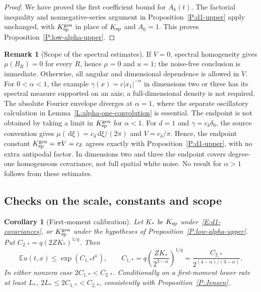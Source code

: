 \documentclass[12pt]{article}
\numberwithin{equation}{section}
\newtheorem{corollary}[theorem]{Corollary}
\theoremstyle{definition}
\newtheorem{remark}[theorem]{Remark}
\newcommand{\E}{\mathbb{E}}
\newcommand{\ud}{\,\mathrm{d}}
\begin{document}
\begin{proof}
  We have proved the first coefficient bound for $A_k(t)$. The
  factorial inequality and nonnegative-series argument in
  Proposition~\ref{P:d1-upper} apply unchanged, with
  $K_{\rm sp}^{\rm gen}$ in place of $K_{\rm sp}$ and $A_0=1$.
  This proves Proposition~\ref{P:low-alpha-upper}.
\end{proof}

\begin{remark}[Scope of the spectral estimates]\label{R:low-alpha-scope}
  If $V=0$, spectral homogeneity gives $\mu(B_R)=0$ for every $R$,
  hence $\mu=0$ and $u=1$; the noise-free conclusion is immediate.
  Otherwise, all angular and dimensional dependence is allowed in
  $V$. For $0<\alpha<1$, the example
  $\gamma(x)=c|x_1|^{-\alpha}$ in dimensions two or three has its
  spectral measure supported on an axis; a full-dimensional density
  is not required. The absolute Fourier envelope diverges at
  $\alpha=1$, where the separate oscillatory calculation in
  Lemma~\ref{L:alpha-one-convolution} is essential. The endpoint is
  not obtained by taking a limit in $K_{\rm sp}^{\rm gen}$ for
  $\alpha<1$. For $d=1$ and $\gamma=c_\delta\delta_0$, the source
  convention gives $\mu(\ud\xi)=c_\delta\ud\xi/(2\pi)$ and
  $V=c_\delta/\pi$. Hence, the endpoint constant
  $K_{\rm sp}^{\rm gen}=\pi V=c_\delta$ agrees exactly with
  Proposition~\ref{P:d1-upper}, with no extra antipodal factor.
  In dimensions two and three the endpoint covers degree-one
  homogeneous covariance, not full spatial white noise. No result
  for $\alpha>1$ follows from these estimates.
\end{remark}

\subsection{Checks on the scale, constants and scope}

\begin{corollary}[First-moment calibration]\label{C:d1-first-calibration}
  Let $K_*$ be $K_{\rm sp}$ under~\eqref{E:d1-covariances}, or
  $K_{\rm sp}^{\rm gen}$ under the hypotheses of
  Proposition~\ref{P:low-alpha-upper}. Put
  $C_{2,*}=q(2ZK_*)^{1/q}$. Then
  \begin{equation}\label{E:d1-first-calibration}
    \E u(t,x)\le\exp(C_{1,*}t^\kappa),\qquad
    C_{1,*}=q\left(\frac{ZK_*}{2^{3-\alpha}}\right)^{1/q}
    =\frac{C_{2,*}}{2^{(4-\alpha)/(3-\alpha)}}.
  \end{equation}
  In either nonzero case $2C_{1,*}<C_{2,*}$.
  Conditionally on a first-moment lower rate at least $L_*$,
  $2L_*\le2C_{1,*}<C_{2,*}$, consistently with
  Proposition~\ref{P:Jensen}.
\end{corollary}
\end{document}
